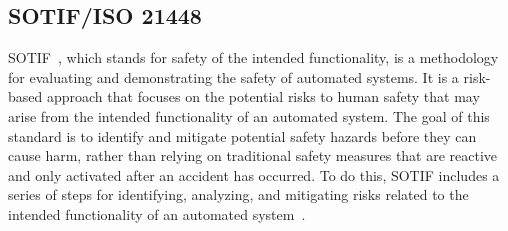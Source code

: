 
    \subsection{SOTIF/ISO 21448}
    
    SOTIF~\cite{sotif}, which stands for safety of the intended functionality, is a methodology for evaluating and demonstrating the safety of automated systems. It is a risk-based approach that focuses on the potential risks to human safety that may arise from the intended functionality of an automated system. The goal of this standard is to identify and mitigate potential safety hazards before they can cause harm, rather than relying on traditional safety measures that are reactive and only activated after an accident has occurred. To do this, SOTIF includes a series of steps for identifying, analyzing, and mitigating risks related to the intended functionality of an automated system~\cite{sotif}.
    
